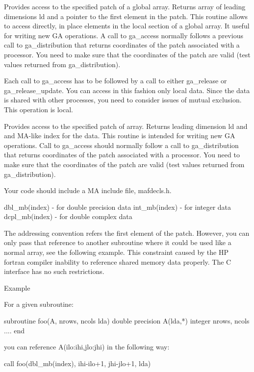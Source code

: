 \documentclass[12pt]{article}
\begin{document}
\begin{desc}

Provides access to the specified patch of a global array. Returns array of leading dimensions ld and a pointer to the first element in the patch. This routine allows to access directly, in place elements in the local section of a global array. It useful for writing new GA operations. A call to ga_access normally follows a previous call to ga_distribution that returns coordinates of the patch associated with a processor. You need to make sure that the coordinates of the patch are valid (test values returned from ga_distribution).

Each call to ga_access has to be followed by a call to either ga_release or ga_release_update. You can access in this fashion only local data. Since the data is shared with other processes, you need to consider issues of mutual exclusion.
This operation is local.
\end{desc}


\begin{fdesc}

  Provides access to the specified patch of array. Returns leading
  dimension ld and and MA-like index for the data. This routine is
  intended for writing new GA operations. Call to ga_access should
  normally follow a call to ga_distribution that returns coordinates
  of the patch associated with a processor. You need to make sure that
  the coordinates of the patch are valid (test values returned from
  ga_distribution).

Your code should include a MA include file, mafdecls.h. 
\begin{codeseg}       
          dbl_mb(index)  - for double precision data
          int_mb(index)  - for integer data
          dcpl_mb(index) - for double complex data
\end{codeseg}

The addressing convention refers the first element 
of the patch. However, you can only pass that reference to another
subroutine where it could be used like a normal array, see the
following example. This constraint caused by the HP fortran compiler
inability to reference shared memory data properly. The C interface
has no such restrictions.

Example

For a given subroutine:
\begin{codeseg}
          subroutine foo(A,  nrows, ncols lda)
          double precision A(lda,*)
          integer nrows, ncols
             ....
          end
\end{codeseg}
you can reference A(ilo:ihi,jlo:jhi) in the following way:

\begin{codeseg}
          call foo(dbl_mb(index), ihi-ilo+1, jhi-jlo+1, lda)
\end{codeseg}
\end{fdesc}
\end{document}
